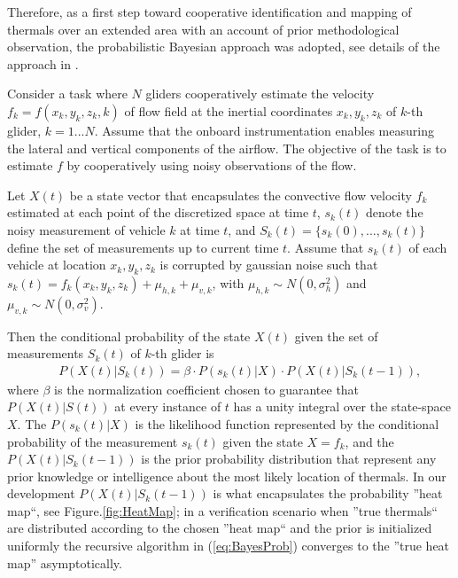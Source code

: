 \documentclass{ifacconf}
\begin{document}
Therefore, as a first step toward cooperative identification and mapping of thermals over an extended area with an account of prior methodological observation, the probabilistic Bayesian approach was adopted, see details of the approach in \cite{Bergman:1999}.

Consider a task where $N$ gliders cooperatively estimate the velocity $f_k=f(x_k,y_k,z_k,k)$ of flow field  at  the inertial coordinates $x_k,y_k,z_k$  of $k$-th glider, $k=1...N$. Assume that the onboard instrumentation enables measuring the lateral and vertical components of the airflow. The objective of the task is to estimate $f$ by cooperatively using noisy observations of the flow. 

Let $X(t)$ be a state vector that encapsulates the convective flow velocity $f_k$ estimated at each point of the discretized space at time $t$, $s_k(t)$ denote the noisy measurement of vehicle $k$ at time $t$, and $S_k(t)=\{s_k(0),...,s_k(t)\}$ define the set of measurements up to current time $t$. Assume that $s_k(t)$ of each vehicle at location $x_k,y_k,z_k$ is corrupted by gaussian noise such that $s_k(t)=f_k(x_k,y_k,z_k)+\mu_{h,k}+\mu_{v,k}$, with $\mu_{h,k}\sim N(0,\sigma^2_h)$ and $\mu_{v,k}\sim N(0,\sigma^2_v)$.

Then the conditional probability of the state $X(t)$ given the set of measurements $S_k(t)$ of $k$-th glider is
\begin{eqnarray}
    && P(X(t)\vert S_k(t))=\beta \cdot P(s_k(t) \vert X)\cdot P(X(t) \vert S_k(t-1)),
    \label{eq:BayesProb}
\end{eqnarray}
where $\beta$ is the normalization coefficient chosen to guarantee that $P(X(t)\vert S(t))$ at every instance of $t$ has a unity integral over the state-space $X$.  The $P(s_k(t) \vert X)$ is the likelihood function represented by the conditional probability of the measurement $s_k(t)$ given the state $X=f_k$, and the $P(X(t) \vert S_k(t-1))$ is the prior probability distribution that represent any prior knowledge or intelligence about the most likely location of thermals. In our development $P(X(t) \vert S_k(t-1))$ is what encapsulates the probability ''heat map``, see Figure.\ref{fig:HeatMap}; in a verification scenario when ''true thermals`` are distributed according to the chosen ''heat map`` and the prior is initialized uniformly the recursive algorithm in (\ref{eq:BayesProb}) converges   to the ''true heat map'' asymptotically.
\end{document}
